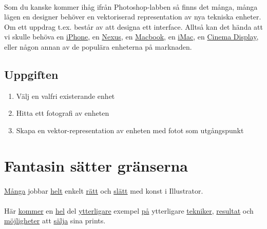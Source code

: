 \documentclass{article}
\begin{document}
    \paragraph{}
    Som du kanske kommer ihåg ifrån Photoshop-labben så finns det många, många lägen en designer behöver en vektoriserad representation av nya tekniska enheter. Om ett uppdrag t.ex. består av att designa ett interface. Alltså kan det hända att vi skulle behöva en
    \href{http://dribbble.com/shots/969976-Sketched-Minimus}{iPhone}, en
    \href{http://dribbble.com/shots/931519-Nexus-4-Vector-Mockup}{Nexus}, en
    \href{http://dribbble.com/shots/1143675-Flat-Macbook-Pro-Freebie}{Macbook}, en
    \href{http://dribbble.com/shots/971338-iMac-youMac-he-sheMac}{iMac}, en
    \href{http://www.pinterest.com/pin/536350636843223522}{Cinema Display}, eller någon annan av de populära enheterna på marknaden.

    \subsection*{ Uppgiften }
      \begin{enumerate}
        \item Välj en valfri existerande enhet
        \item Hitta ett fotografi av enheten
        \item Skapa en vektor-representation av enheten med fotot som utgångspunkt
      \end{enumerate}


     
  \newpage
  \section{ Fantasin sätter gränserna }
    \paragraph{}
    \href{http://www.behance.net/gallery/Prints-2012/3565675}{Många}
    jobbar
    \href{http://mattlyon.tumblr.com/}{helt}
    enkelt
    \href{http://www.pinterest.com/pin/433260426621559006/}{rätt}
    och
    \href{http://www.pinterest.com/source/c8six.com/}{slätt}
    med konst i Illustrator.

    \paragraph{}
    Här
    \href{http://www.pinterest.com/pin/183451384791435134/}{kommer}
    en
    \href{http://society6.com/product/Forest-Pastel-Rzc_Print}{hel}
    del
    \href{http://society6.com/product/Miami-vVL_Print}{ytterligare}
    exempel
    \href{http://society6.com/product/Balloon-ylb_Print}{på}
    ytterligare
    \href{http://society6.com/product/Boston-chI_Print}{tekniker},
    \href{http://society6.com/product/Colorful-Rectangles_Print}{resultat}
    och
    \href{http://society6.com/product/The-end-of-the-rainbow-POk_Print}{möjligheter}
    att
    \href{http://society6.com/product/Here-comes-the-sun-e7D_Print}{sälja}
    sina prints.
\end{document}
